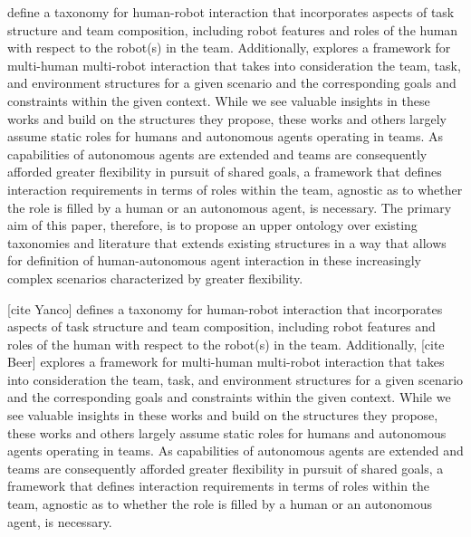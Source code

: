 \documentclass[letterpaper, 10 pt, conference]{ieeeconf}  %
\theoremstyle{definition}
\begin{document}
\cite{Yanco2004updated} define a taxonomy for human-robot interaction that incorporates aspects of task structure and team composition, including robot features and roles of the human with respect to the robot(s) in the team. Additionally, \cite{Beer2017} explores a framework for multi-human multi-robot interaction that takes into consideration the team, task, and environment structures for a given scenario and the corresponding goals and constraints within the given context. While we see valuable insights in these works and build on the structures they propose, these works and others largely assume static roles for humans and autonomous agents operating in teams. As capabilities of autonomous agents are extended and teams are consequently afforded greater flexibility in pursuit of shared goals, a framework that defines interaction requirements in terms of roles within the team, agnostic as to whether the role is filled by a human or an autonomous agent, is necessary. The primary aim of this paper, therefore, is to propose an upper ontology over existing taxonomies and literature that extends existing structures in a way that allows for definition of human-autonomous agent interaction in these increasingly complex scenarios characterized by greater flexibility.

[cite Yanco] defines a taxonomy for human-robot interaction that incorporates aspects of task structure and team composition, including robot features and roles of the human with respect to the robot(s) in the team. Additionally, [cite Beer] explores a framework for multi-human multi-robot interaction that takes into consideration the team, task, and environment structures for a given scenario and the corresponding goals and constraints within the given context. While we see valuable insights in these works and build on the structures they propose, these works and others largely assume static roles for humans and autonomous agents operating in teams. As capabilities of autonomous agents are extended and teams are consequently afforded greater flexibility in pursuit of shared goals, a framework that defines interaction requirements in terms of roles within the team, agnostic as to whether the role is filled by a human or an autonomous agent, is necessary. 
\end{document}
